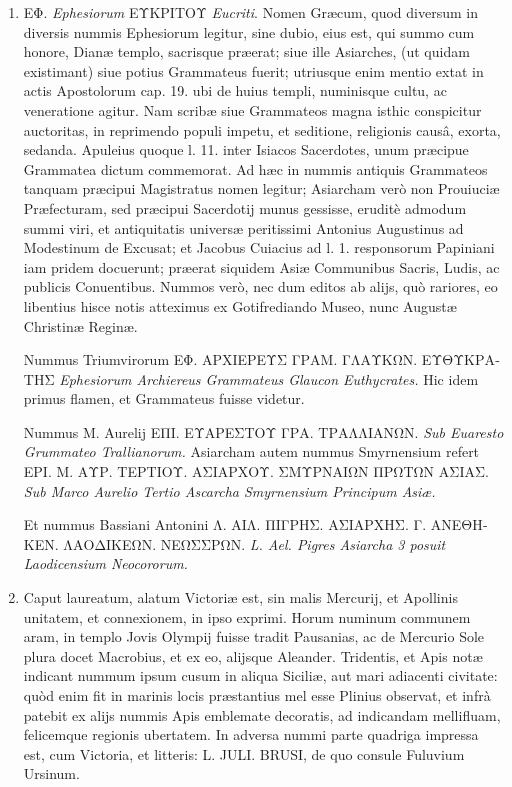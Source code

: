 \documentclass[a4paper, 11pt, oneside, polutonikogreek, latin]{article}
\begin{document}
\begin{enumerate}
    \item \foreignlanguage{greek}{ΕΦ.} \emph{Ephesiorum} \foreignlanguage{greek}{ΕΥΚΡΙΤΟΥ} \emph{Eucriti}. Nomen Græcum, quod diversum in diversis nummis Ephesiorum legitur, sine dubio, eius est, qui summo cum honore, Dianæ templo, sacrisque præerat; siue ille Asiarches, (ut quidam existimant) siue potius Grammateus fuerit; utriusque enim mentio extat in actis Apostolorum cap. 19. ubi de huius templi, numinisque cultu, ac veneratione agitur. Nam scribæ siue Grammateos magna isthic conspicitur auctoritas, in reprimendo populi impetu, et seditione, religionis causâ, exorta, sedanda. Apuleius quoque l. 11. inter Isiacos Sacerdotes, unum præcipue Grammatea dictum commemorat. Ad hæc in nummis antiquis Grammateos tanquam præcipui Magistratus nomen legitur; Asiarcham verò non Prouiuciæ Præfecturam, sed præcipui Sacerdotij munus gessisse, eruditè admodum summi viri, et antiquitatis universæ peritissimi Antonius Augustinus ad Modestinum de Excusat; et Jacobus Cuiacius ad l. 1. responsorum Papiniani iam pridem docuerunt; præerat siquidem Asiæ Communibus Sacris, Ludis, ac publicis Conuentibus. Nummos verò, nec dum editos ab alijs, quò rariores, eo libentius hisce notis atteximus ex Gotifrediando Museo, nunc Augustæ Christinæ Reginæ.

    Nummus Triumvirorum \foreignlanguage{greek}{ΕΦ. ΑΡΧΙΕΡΕΥΣ ΓΡΑΜ. ΓΛΑΥKΩΝ. ΕΥΘΥΚΡΑΤΗΣ} \emph{Ephesiorum Archiereus Grammateus Glaucon Euthycrates.} Hic idem primus flamen, et Grammateus fuisse videtur.

    Nummus M. Aurelij \foreignlanguage{greek}{ΕΠΙ. ΕΥΑΡΕΣΤΟΥ ΓΡΑ. ΤΡΑΛΛΙΑΝΩΝ.} \emph{Sub Euaresto Grummateo Trallianorum.} Asiarcham autem nummus Smyrnensium refert \foreignlanguage{greek}{ΕΡΙ. M. ΑΥΡ. ΤΕΡΤΙΟΥ. ΑΣΙΑΡΧΟΥ. ΣΜΥΡΝΑIΩΝ ΠΡΩTΩΝ ΑΣΙΑΣ.} \emph{Sub Marco Aurelio Tertio Ascarcha Smyrnensium Principum Asiæ.}

    Et nummus Bassiani Antonini \foreignlanguage{greek}{Λ. ΑΙΛ. ΠΙΓΡΗΣ. ΑΣΙΑΡΧΗΣ. Γ. ΑΝΕΘΗΚΕΝ. ΛΑΟΔΙΚΕΩΝ. ΝΕΩΣΣΡΩΝ.} \emph{L. Ael. Pigres Asiarcha 3 posuit Laodicensium Neocororum.}

    \item Caput laureatum, alatum Victoriæ est, sin malis Mercurij, et Apollinis unitatem, et connexionem, in ipso exprimi. Horum numinum communem aram, in templo Jovis Olympij fuisse tradit Pausanias, ac de Mercurio Sole plura docet Macrobius, et ex eo, alijsque Aleander. Tridentis, et Apis notæ indicant nummum ipsum cusum in aliqua Siciliæ, aut mari adiacenti civitate: quòd enim fit in marinis locis præstantius mel esse Plinius observat, et infrà patebit ex alijs nummis Apis emblemate decoratis, ad indicandam mellifluam, felicemque regionis ubertatem. In adversa nummi parte quadriga impressa est, cum Victoria, et litteris: L. JULI. BRUSI, de quo consule Fuluvium Ursinum.


\end{enumerate}
\end{document}
